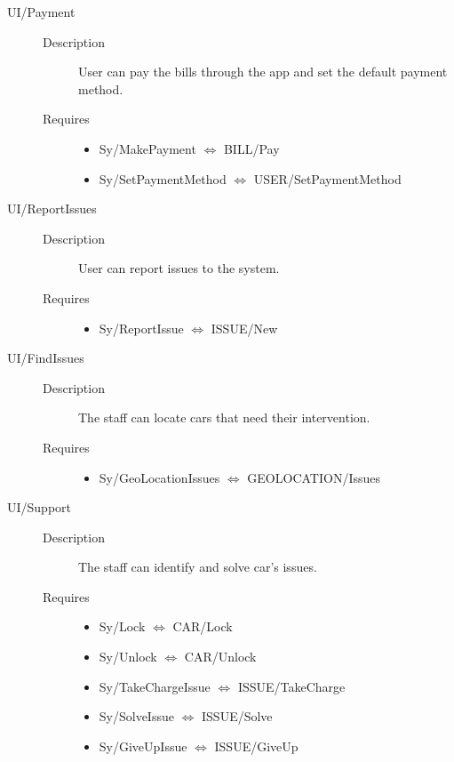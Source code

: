 \documentclass[11pt]{article} %
\begin{document}
\begin{description}
\begin{description}
	\end{description}
	\item[UI/Payment] \hfill
	\begin{description}
		\item[Description] User can pay the bills through the app and set the default payment method.
		\item[Requires] \hfill
		\begin{itemize}
			\item Sy/MakePayment $\Leftrightarrow$ BILL/Pay
			\item Sy/SetPaymentMethod $\Leftrightarrow$ USER/SetPaymentMethod
		\end{itemize}
	\end{description}
	\item[UI/ReportIssues] \hfill
	\begin{description}
		\item[Description] User can report issues to the system.
		\item[Requires] \hfill
		\begin{itemize}
			\item Sy/ReportIssue $\Leftrightarrow$ ISSUE/New
		\end{itemize}
	\end{description}
	\item[UI/FindIssues] \hfill
	\begin{description}
		\item[Description] The staff can locate cars that need their intervention.
		\item[Requires] \hfill
		\begin{itemize}
			\item Sy/GeoLocationIssues $\Leftrightarrow$ GEOLOCATION/Issues
		\end{itemize}
	\end{description}
	\item[UI/Support] \hfill
	\begin{description}
		\item[Description] The staff can identify and solve car’s issues.
		\item[Requires] \hfill
		\begin{itemize}
			\item Sy/Lock $\Leftrightarrow$ CAR/Lock
			\item Sy/Unlock $\Leftrightarrow$ CAR/Unlock
			\item Sy/TakeChargeIssue  $\Leftrightarrow$ ISSUE/TakeCharge
			\item Sy/SolveIssue $\Leftrightarrow$ ISSUE/Solve
			\item Sy/GiveUpIssue $\Leftrightarrow$ ISSUE/GiveUp
		\end{itemize}
	\end{description}
\end{description}
\end{document}
